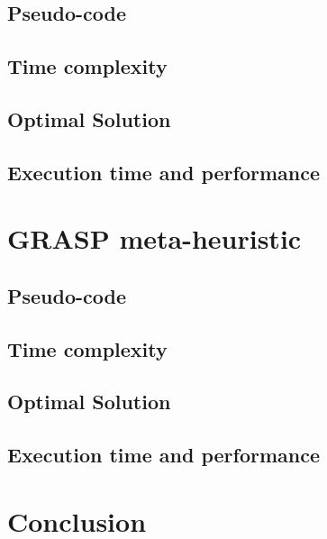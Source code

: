 \documentclass[a4paper, 12pt]{report}
\begin{document}
		\section{Pseudo-code}
		\section{Time complexity}
		\section{Optimal Solution}
		\section{Execution time and performance}
	
	\chapter{GRASP meta-heuristic}
		\section{Pseudo-code}
		\section{Time complexity}
		\section{Optimal Solution}
		\section{Execution time and performance}
	
	\chapter{Conclusion}
	
	
	
	
\end{document}
